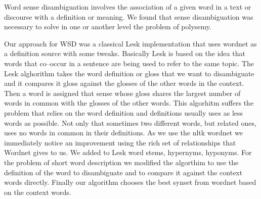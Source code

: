 Word sense disambiguation involves the association of a given word in a text or discourse with a definition or meaning.
We found that sense disambiguation was necessary to solve in one or another level the problem of polysemy.

Our approach for WSD was a classical Lesk implementation that uses wordnet as a definition source with some tweaks.
Basically Lesk is based on the idea that words that co–occur in a sentence are being used to refer to the same topic.
The Lesk alghorithm \cite{LESK} takes the word definition or gloss that we want to disambiguate and it compares it gloss against the glosses of the other words in the context.
Then a word is assigned that sense whose gloss shares the largest number of words in common with the glosses of the other words.
This algorhitm suffers the problem that relies on the word definition and definitions usually uses as less words as possible.
Not only that sometimes two different words, but related ones, uses no words in common in their definitions.
As we use the nltk wordnet we immediately notice an improvement using the rich set of relationships that Wordnet gives to us.
We added to Lesk word stems, hypernyms, hyponyms.
For the problem of short word description we modified the algorthim to use the definition of the word to disambiguate and to compare it against the context words directly.
Finally our algorithm chooses the best synset from wordnet based on the context words.
